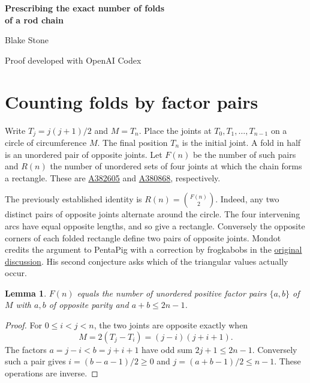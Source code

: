 \documentclass[11pt,letterpaper]{article}
\newtheorem{lemma}[theorem]{Lemma}
\newcommand{\bin}[2]{\binom{#1}{#2}}
\begin{document}
\begin{center}
{\LARGE\bfseries Prescribing the exact number of folds\\[2pt] of a rod chain}\par\vspace{8pt}
Blake Stone\par{\small Proof developed with OpenAI Codex}
\end{center}
\begin{abstract}
Join rods of lengths $1,2,\ldots,n$ in their cyclic order. For each $k\ge1$ we construct infinitely many $n$ for which the chain folds in half at exactly $k$ distinct pairs of joints. Such $n$ occur in each of the classes $0$ and $3$ modulo $4$. Consequently every triangular number occurs infinitely often among the rectangle counts of OEIS A380868. This proves Conjecture 2 of Daniel Mondot. The construction uses a factorization of the perimeter and Dirichlet's theorem on primes in arithmetic progressions.
\end{abstract}

\section*{Counting folds by factor pairs}
Write $T_j=j(j+1)/2$ and $M=T_n$. Place the joints at $T_0,T_1,\ldots,T_{n-1}$ on a circle of circumference $M$. The final position $T_n$ is the initial joint. A fold in half is an unordered pair of opposite joints. Let $F(n)$ be the number of such pairs and $R(n)$ the number of unordered sets of four joints at which the chain forms a rectangle. These are \href{https://oeis.org/A382605}{A382605} and \href{https://oeis.org/A380868}{A380868}, respectively.

The previously established identity is $R(n)=\bin{F(n)}2$. Indeed, any two distinct pairs of opposite joints alternate around the circle. The four intervening arcs have equal opposite lengths, and so give a rectangle. Conversely the opposite corners of each folded rectangle define two pairs of opposite joints. Mondot credits the argument to PentaPig with a correction by frogkabobs in the \href{https://www.reddit.com/r/math/comments/1mfcodo/}{original discussion}. His second conjecture asks which of the triangular values actually occur.

\begin{lemma}\label{factor}
$F(n)$ equals the number of unordered positive factor pairs $\{a,b\}$ of $M$ with $a,b$ of opposite parity and $a+b\le 2n-1$.
\end{lemma}
\begin{proof}
For $0\le i<j<n$, the two joints are opposite exactly when
\[
 M=2(T_j-T_i)=(j-i)(j+i+1).
\]
The factors $a=j-i<b=j+i+1$ have odd sum $2j+1\le2n-1$. Conversely such a pair gives $i=(b-a-1)/2\ge0$ and $j=(a+b-1)/2\le n-1$. These operations are inverse.
\end{proof}
\end{document}

